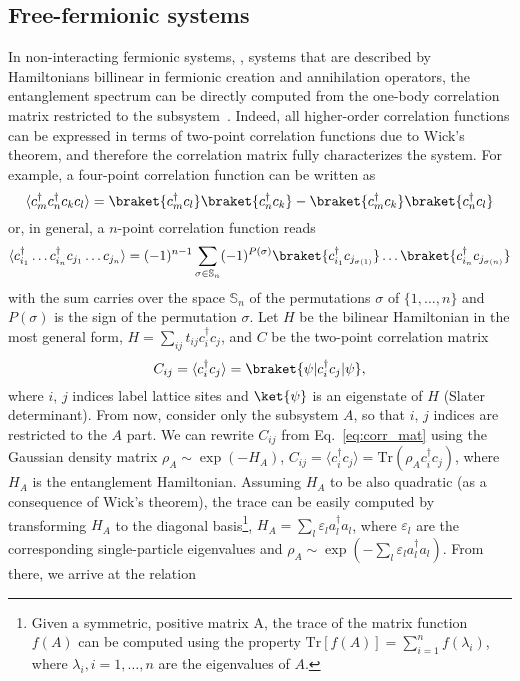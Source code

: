 \subsection{Free-fermionic systems}
In non-interacting fermionic systems, \ie, systems that are described by Hamiltonians billinear in fermionic creation and annihilation operators, the entanglement spectrum can be directly computed from the one-body correlation matrix restricted to the subsystem~\cite{Peschel}. Indeed, all higher-order correlation functions can be expressed in terms of two-point correlation functions due to Wick's theorem, and therefore the correlation matrix fully characterizes the system. For example, a four-point correlation function can be written as
\begin{equation}
\langle c_m^{\dagger} c_n^{\dagger} c_k c_l \rangle = \braket{c_m^{\dagger} c_l}  \braket{c_n^{\dagger} c_k} - \braket{c_m^{\dagger} c_k}  \braket{c_n^{\dagger} c_l} 
\end{equation}
or, in general, a $n$-point correlation function reads
\begin{equation}
\langle c_{i_1}^{\dagger} \ldots  c_{i_n}^{\dagger}  c_{j_1} \ldots c_{j_n} \rangle = (-1)^{n-1} \sum_{\sigma \in \mathbb{S}_n} (-1)^{P ( \sigma) } \braket{c_{i_1}^{\dagger} c_{j_{\sigma (1)}}} \ldots \braket{c_{i_n}^{\dagger} c_{j_{\sigma (n)}}}
\end{equation}
with the sum carries over the space $\mathbb{S}_n$ of the permutations $\sigma$ of $\lbrace 1 , \ldots, n \rbrace$ and $P(\sigma)$ is the sign of the permutation $\sigma$. Let $H$ be the bilinear Hamiltonian in the most general form, $H =  \sum_{ij} t_{ij} c_i^{\dagger} c_j$, and $C$ be the two-point correlation matrix 
\begin{equation}
C_{ij} = \langle c_i^{\dagger} c_j \rangle = \braket{\psi | c_i^{\dagger} c_j  | \psi},
\label{eq:corr_mat}
\end{equation}
where $i, \, j$ indices label lattice sites and $\ket{\psi}$ is an eigenstate of $H$ (Slater determinant). From now, consider only the subsystem $A$, so that $i, \, j$ indices are restricted to the $A$ part. We can rewrite $C_{ij}$ from Eq.~\eqref{eq:corr_mat} using the Gaussian density matrix $\rho_A \sim \exp ( - H_A )$, $C_{ij} = \langle c_i^{\dagger} c_j \rangle = \mathrm{Tr} \left( \rho_A  c_i^{\dagger} c_j \right)$, where $H_A$ is the entanglement Hamiltonian. Assuming $H_A$ to be also quadratic (as a consequence of Wick's theorem), the trace can be easily computed by transforming $H_A$ to the diagonal basis\footnote{Given a symmetric, positive matrix A, the trace of the matrix function $f(A)$ can be computed using the property $\mathrm{Tr} \left[ f(A) \right] = \sum_{i = 1}^n f(\lambda_i)$, where $\lambda_i, i = 1, \ldots, n$ are the eigenvalues of $A$.}, $H_A = \sum_l \varepsilon_l a_l^{\dagger} a_l$, where $\varepsilon_l$ are the corresponding single-particle eigenvalues and $\rho_A \sim \exp \left( - \sum_l \varepsilon_l a_l^{\dagger} a_l \right)$. From there, we arrive at the relation 

